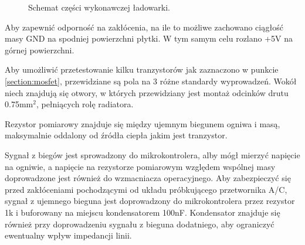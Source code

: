 \documentclass[polish,engineer]{polsl-msth}
\begin{document}
\begin{figure}[hbtp]
     \caption{Schemat części wykonawczej ładowarki. \label{img:pcb_colored}}
\end{figure}

Aby zapewnić odporność na zakłócenia, na ile to możliwe zachowano ciągłość masy GND na spodniej powierzchni płytki. W tym samym celu rozlano +5V na górnej powierzchni. 

Aby umożliwić przetestowanie kilku tranzystorów jak zaznaczono w punkcie \ref{section:mosfet}, przewidziane są pola na 3 różne standardy wyprowadzeń. Wokół niech znajdują się otwory, w których przewidziany jest montaż odcinków drutu 0.75mm$^2$, pełniących rolę radiatora.

Rezystor pomiarowy znajduje się między ujemnym biegunem ogniwa i masą, maksymalnie oddalony od źródła ciepła jakim jest tranzystor. 

Sygnał z biegów jest sprowadzony do mikrokontrolera, alby mógł mierzyć napięcie na ogniwie, a napięcie na rezystorze pomiarowym względem wspólnej masy doprowadzone jest również do wzmacniacza operacyjnego. Aby zabezpieczyć się przed zakłóceniami pochodzącymi od układu próbkującego przetwornika A/C, sygnał z ujemnego bieguna jest doprowadzony do mikrokontrolera przez rezystor 1k i buforowany na miejscu kondensatorem 100nF. Kondensator znajduje się również przy doprowadzeniu sygnału z bieguna dodatniego, aby ograniczyć ewentualny wpływ impedancji linii.
\end{document}
